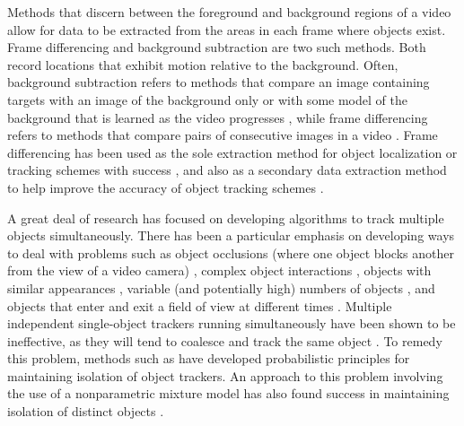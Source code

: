 \documentclass{article}
\begin{document}
Methods that discern between the foreground and background regions of a video allow for data to be extracted from the areas in each frame where objects exist. Frame differencing and background subtraction are two such methods. Both record locations that exhibit motion relative to the background. Often, background subtraction refers to methods that compare an image containing targets with an image of the background only or with some model of the background that is learned as the video progresses \cite{piccardi2004background}, while frame differencing refers to methods that compare pairs of consecutive images in a video \cite{zhang2001segmentation}. Frame differencing has been used as the sole extraction method for object localization or tracking schemes with success \citep{pece_2002, beleznai_2006, chu_2007}, and also as a secondary data extraction method to help improve the accuracy of object tracking schemes \citep{perez_2002}.

A great deal of research has focused on developing algorithms to track multiple objects simultaneously. There has been a particular emphasis on developing ways to deal with problems such as object occlusions (where one object blocks another from the view of a video camera) \cite{senior2006appearance, cucchiara2004probabilistic, zhou2003background}, complex object interactions \cite{khan_2004, mckenna2000tracking, dockstader2001multiple}, objects with similar appearances \cite{maccormick1999probabilistic, jepson_2003}, variable (and potentially high) numbers of objects \cite{reilly2010detection}, and objects that enter and exit a field of view at different times \cite{stauffer2003estimating, nedrich2010learning}. Multiple independent single-object trackers running simultaneously have been shown to be ineffective, as they will tend to coalesce and track the same object \cite{khan_2004}. To remedy this problem, methods such as \cite{maccormick1999probabilistic} have developed probabilistic principles for maintaining isolation of object trackers. An approach to this problem involving the use of a nonparametric mixture model has also found success in maintaining isolation of distinct objects \cite{vermaak_2003}.
\end{document}
